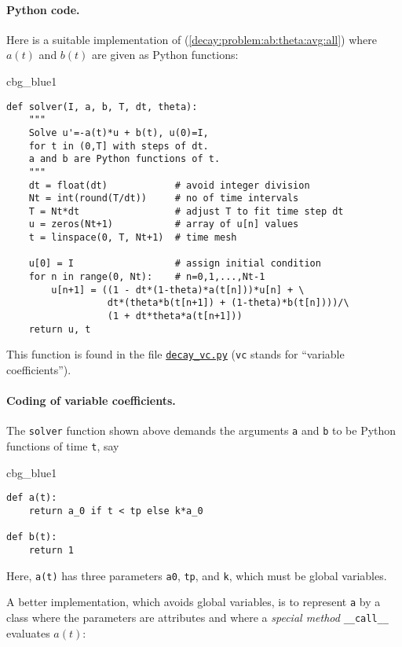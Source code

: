 \documentclass[graybox,sectrefs,envcountresetchap,open=right,final]{svmonodo}
\newenvironment{_cod_tight}[1]{
   \def\FrameCommand{\colorbox{#1}}
   \FrameRule0.6pt\MakeFramed {\FrameRestore}\vskip3mm}
   {\vskip0mm\endMakeFramed}
\newenvironment{cod}[1]{
\bgroup\rmfamily
\fboxsep=0mm\relax
\begin{_cod_tight}{#1}
\list{}{\parsep=-2mm\parskip=0mm\topsep=0pt\leftmargin=2mm
\rightmargin=2\leftmargin\leftmargin=4pt\relax}
\item\relax}
{\endlist\end{_cod_tight}\egroup}
\begin{document}
\paragraph{Python code.}
Here is a suitable implementation of (\ref{decay:problem:ab:theta:avg:all})
where $a(t)$ and $b(t)$ are given as
Python functions:

\begin{cod}{cbg_blue1}\begin{Verbatim}[numbers=none,fontsize=\fontsize{9pt}{9pt},baselinestretch=0.95,xleftmargin=2mm]
def solver(I, a, b, T, dt, theta):
    """
    Solve u'=-a(t)*u + b(t), u(0)=I,
    for t in (0,T] with steps of dt.
    a and b are Python functions of t.
    """
    dt = float(dt)            # avoid integer division
    Nt = int(round(T/dt))     # no of time intervals
    T = Nt*dt                 # adjust T to fit time step dt
    u = zeros(Nt+1)           # array of u[n] values
    t = linspace(0, T, Nt+1)  # time mesh

    u[0] = I                  # assign initial condition
    for n in range(0, Nt):    # n=0,1,...,Nt-1
        u[n+1] = ((1 - dt*(1-theta)*a(t[n]))*u[n] + \ 
                  dt*(theta*b(t[n+1]) + (1-theta)*b(t[n])))/\ 
                  (1 + dt*theta*a(t[n+1]))
    return u, t
\end{Verbatim}
\end{cod}
\noindent
This function is found in the file \href{{http://tinyurl.com/ofkw6kc/genz/decay_vc.py}}{\nolinkurl{decay_vc.py}} (\texttt{vc} stands for ``variable coefficients'').

\paragraph{Coding of variable coefficients.}
The \texttt{solver} function shown above demands the arguments \texttt{a} and \texttt{b} to
be Python functions of time \texttt{t}, say

\begin{cod}{cbg_blue1}\begin{Verbatim}[numbers=none,fontsize=\fontsize{9pt}{9pt},baselinestretch=0.95,xleftmargin=2mm]
def a(t):
    return a_0 if t < tp else k*a_0

def b(t):
    return 1
\end{Verbatim}
\end{cod}
\noindent
Here, \texttt{a(t)} has three parameters \texttt{a0}, \texttt{tp}, and \texttt{k},
which must be global variables.

A better implementation, which avoids global variables,
is to represent \texttt{a} by a class where the
parameters are attributes and where a \emph{special method} \Verb!__call__!
evaluates $a(t)$:
\end{document}
